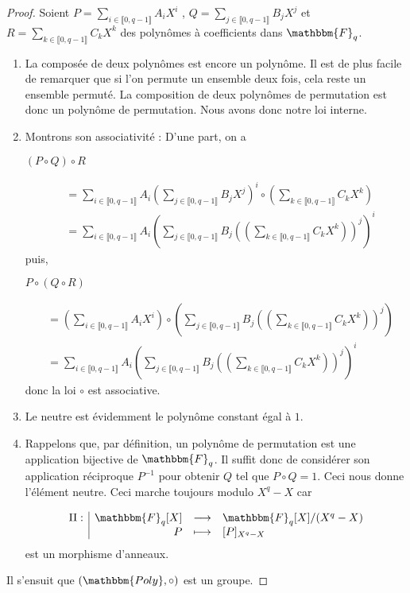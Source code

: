 \documentclass[12pt]{article}
\newcommand{\fonction}[5]{
\begin{displaymath}
\begin{array}{l|rcl}
\displaystyle
#1 : & #2 & \longrightarrow & #3 \\
    & #4 & \longmapsto & #5
\end{array}
\end{displaymath}
}
\theoremstyle{remark}\newtheorem{note}{Note}
\theoremstyle{remark}\newtheorem{nota}{Notation}
\newcommand{\Fq}{\mathbbm{F}_q}
\theoremstyle{definition}
\begin{document}
\begin{proof}
Soient $ P = \displaystyle\sum_{i \in \llbracket 0, q-1 \rrbracket} A_i X^i$ , $Q = \displaystyle\sum_{j \in \llbracket 0, q-1 \rrbracket} B_j X^j$ et $R = \displaystyle\sum_{k \in \llbracket 0, q-1 \rrbracket} C_k X^k$ des polynômes à coefficients dans $\Fq$. \newline
\break
	\begin{enumerate}[label=$\clubsuit$, font=\small  \color{black}]
		\item La composée de deux polynômes est encore un polynôme. Il est de plus facile de remarquer que si l'on permute un ensemble deux fois, cela reste un ensemble permuté. La composition de deux polynômes de permutation est donc un polynôme de permutation. Nous avons donc notre loi interne.
		\item Montrons son associativité : \newline
D'une part, on a
			\begin{center} $\left( P\circ Q \right) \circ R$ \end{center}
			\begin{align*} 
&= \displaystyle\sum_{i \in \llbracket 0, q-1 \rrbracket} A_i\left(\displaystyle\sum_{j \in \llbracket 0, q-1 \rrbracket} B_j X^j\right)^i \circ \left(\displaystyle\sum_{k \in \llbracket 0, q-1 \rrbracket} C_k X^k\right) \\ 
&= \displaystyle\sum_{i \in \llbracket 0, q-1 \rrbracket} A_i\left(\displaystyle\sum_{j \in \llbracket 0, q-1 \rrbracket} B_j \left(\left(\displaystyle\sum_{k \in \llbracket 0, q-1 \rrbracket} C_k X^k\right)\right)^j\right)^i
			\end{align*} 
puis, 
			\begin{center} $P\circ \left(Q \circ R\right)$ \end{center}
			\begin{align*} 
&= \left(\displaystyle\sum_{i \in \llbracket 0, q-1 \rrbracket} A_i X^i\right) \circ \left(\displaystyle\sum_{j \in \llbracket 0, q-1 \rrbracket} B_j \left(\left(\displaystyle\sum_{k \in \llbracket 0, q-1 \rrbracket} C_k X^k\right)\right)^j\right) \\
&=  \displaystyle\sum_{i \in \llbracket 0, q-1 \rrbracket} A_i\left(\displaystyle\sum_{j \in \llbracket 0, q-1 \rrbracket} B_j \left(\left(\displaystyle\sum_{k \in \llbracket 0, q-1 \rrbracket} C_k X^k\right)\right)^j\right)^i
			\end{align*} 
donc la loi $\circ$ est associative.
	\item Le neutre est évidemment le polynôme constant égal à $1$.
	\item Rappelons que, par définition, un polynôme de permutation est une application bijective de $\Fq$. Il suffit donc de considérer son application réciproque $P^{-1}$ pour obtenir $Q$ tel que $P\circ Q = 1$. Ceci nous donne l'élément neutre. Ceci marche toujours modulo $X^q - X$ car
	\fonction{\Pi}{\Fq[X]}{\Fq[X] / (X^q - X)}{P}{[P]_{X^q - X}} est un morphisme d'anneaux.
	\end{enumerate}	
Il s'ensuit que $(\mathbbm{Poly}, \circ)$ est un groupe. 
\end{proof}
\end{document}
